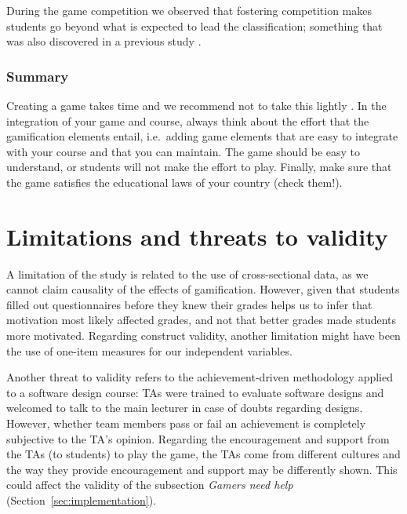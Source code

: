 \documentclass[sigconf]{acmart}
\begin{document}
During the game competition we observed that fostering competition makes
students go beyond what is expected to lead the classification;
something that was also discovered in a previous study
\citep{gamification-leaderboard-benefits}.

\hypertarget{summary}{%
\subsubsection*{Summary}\label{summary}}

Creating a game takes time and we recommend not to take this lightly
\citep{review-gamification-framework}. In the integration of your game
and course, always think about the effort that the gamification elements
entail, i.e.~adding game elements that are easy to integrate with your
course and that you can maintain. The game should be easy to understand,
or students will not make the effort to play. Finally, make sure that
the game satisfies the educational laws of your country (check them!).

\hypertarget{limitations-and-threats-to-validity}{%
\section{Limitations and threats to
validity}\label{limitations-and-threats-to-validity}}

A limitation of the study is related to the use of cross-sectional data,
as we cannot claim causality of the effects of gamification. However,
given that students filled out questionnaires before they knew their
grades helps us to infer that motivation most likely affected grades,
and not that better grades made students more motivated. Regarding
construct validity, another limitation might have been the use of
one-item measures for our independent variables.

Another threat to validity refers to the achievement-driven methodology
applied to a software design course: TAs were trained to evaluate
software designs and welcomed to talk to the main lecturer in case of
doubts regarding designs. However, whether team members pass or fail an
achievement is completely subjective to the TA's opinion. Regarding the
encouragement and support from the TAs (to students) to play the game,
the TAs come from different cultures and the way they provide
encouragement and support may be differently shown. This could affect
the validity of the subsection \textit{Gamers need help}
(Section~\ref{sec:implementation}).
\end{document}
